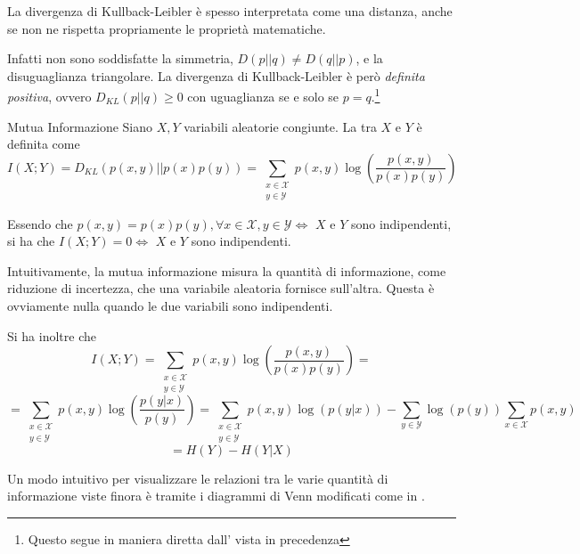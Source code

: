 La divergenza di Kullback-Leibler è spesso interpretata come una distanza, anche se non ne rispetta propriamente le proprietà matematiche.

Infatti non sono soddisfatte la simmetria, \(D(p||q) \neq D(q||p)\), e la disuguaglianza triangolare.
La divergenza di Kullback-Leibler è però \textit{definita positiva}, ovvero \(D_{KL}(p||q) \geq 0\) con uguaglianza se e solo se \(p=q\).\footnote{Questo segue in maniera diretta dall' vista in precedenza}

\begin{definition}{Mutua Informazione}
  Siano \(X,Y\) variabili aleatorie congiunte.
  La  tra \(X\) e \(Y\) è definita come
  \[I(X;Y) = D_{KL}(p(x,y) || p(x)p(y)) = \sum_{\substack{x \in \mathcal{X}\\y \in \mathcal{Y}}} p(x,y) \log\left(\frac{p(x,y)}{p(x)p(y)}\right)\]

  Essendo che \(p(x,y)=p(x)p(y), \forall x\in\mathcal{X}, y\in\mathcal{Y} \iff\) \(X\) e \(Y\) sono indipendenti, si ha che \(I(X;Y) = 0 \iff\) \(X\) e \(Y\) sono indipendenti.
\end{definition}

Intuitivamente, la mutua informazione misura la quantità di informazione, come riduzione di incertezza, che una variabile aleatoria fornisce sull'altra.
Questa è ovviamente nulla quando le due variabili sono indipendenti.

Si ha inoltre che
\[I(X;Y) = \sum_{\substack{x \in \mathcal{X}\\y \in \mathcal{Y}}} p(x,y) \log\left(\frac{p(x,y)}{p(x)p(y)}\right) = \]
\[= \sum_{\substack{x \in \mathcal{X}\\y \in \mathcal{Y}}} p(x,y) \log\left(\frac{p(y|x)}{p(y)}\right) = \sum_{\substack{x\in\mathcal{X}\\y\in\mathcal{Y}}}p(x,y)\log(p(y|x)) - \sum_{y\in\mathcal{Y}}\log(p(y))\sum_{x\in\mathcal{X}}p(x,y)\]
\[= H(Y)-H(Y|X)\]


Un modo intuitivo per visualizzare le relazioni tra le varie quantità di informazione viste finora è tramite i diagrammi di Venn modificati come in .

